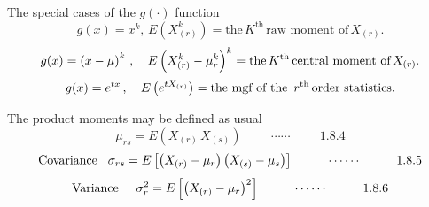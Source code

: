 \documentclass[12pt,a4paper]{report}
\theoremstyle{definition}
\theoremstyle{plain}
\begin{document}
The special cases of the $g(\cdot)$ function
$$g(x) = x^k, \, E\left(X^k_{(r)}\right) = \text{the}\,  K^{\text{th}}\, \text{raw moment of}\,  X_{(r)}.$$
$$g(x) = \left(x - \mu\right)^{k}\, , \, \hspace{0.3cm} E\left(X_{(r)}^k - \mu^k_{r}\right)^k = \text{the}\, K^{\text{th}}\, \text{central moment of}\, X_{(r)}.$$
$$g(x) = e^{tx}\, , \, \hspace{0.3cm} E\left(e^{t X_{(r)}}\right) = \text{the mgf of the }\, r^{\text{th}}\, \text{order statistics}.$$

The product moments may be defined as usual
$$\mu_{rs} = E\left(X_{(r)}\, X_{(s)}\right)\hspace{1cm} \cdots\cdots\hspace{1cm} 1.8.4$$
$$\text{Covariance}\hspace{0.3cm} \sigma_{rs} = E\left[\left(X_{(r)} - \mu_r\right)\left(X_{(s)} - \mu_s\right)\right]\hspace{1cm}\cdots\cdots\hspace{1cm} 1.8.5$$
$$\text{Variance}\hspace{0.5cm} \sigma^{2}_{r} = E\left[\left(X_{(r)} - \mu_r\right)^2\right]\hspace{1cm}\cdots\cdots\hspace{1cm}1.8.6$$
\end{document}
